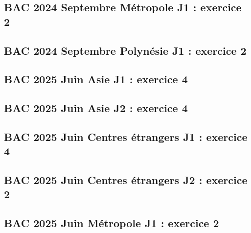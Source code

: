 \documentclass[lang=fr,edition=teacher,layout=sheet]{mxbook}
\begin{document}
\begingroup\endgroup
\par\bigskip
{}\subsection*{BAC 2024 Septembre Métropole J1 : exercice 2}
\begingroup\endgroup
\par\bigskip
{}\subsection*{BAC 2024 Septembre Polynésie J1 : exercice 2}
\begingroup\endgroup
\par\bigskip
{}\subsection*{BAC 2025 Juin Asie J1 : exercice 4}
\begingroup\endgroup
\par\bigskip
{}\subsection*{BAC 2025 Juin Asie J2 : exercice 4}
\begingroup\endgroup
\par\bigskip
{}\subsection*{BAC 2025 Juin Centres étrangers J1 : exercice 4}
\begingroup\endgroup
\par\bigskip
{}\subsection*{BAC 2025 Juin Centres étrangers J2 : exercice 2}
\begingroup\endgroup
\par\bigskip
{}\subsection*{BAC 2025 Juin Métropole J1 : exercice 2}
\end{document}
